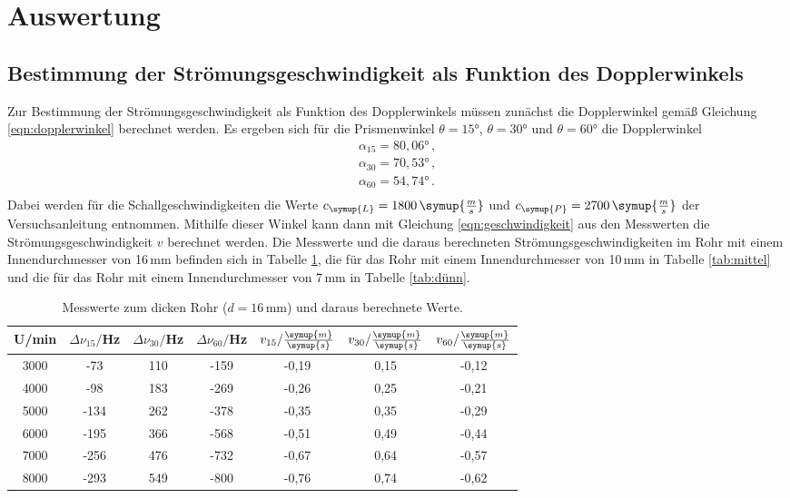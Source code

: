 \section{Auswertung}
\label{sec:Auswertung}

\subsection{Bestimmung der Strömungsgeschwindigkeit als Funktion des Dopplerwinkels}
\label{subsec:geschwindigkeit}

Zur Bestimmung der Strömungsgeschwindigkeit als Funktion des Dopplerwinkels müssen
zunächst die Dopplerwinkel gemäß Gleichung \eqref{eqn:dopplerwinkel} berechnet werden.
Es ergeben sich für die Prismenwinkel $\theta=15°$, $\theta=30°$ und $\theta=60°$
die Dopplerwinkel
\begin{align*}
  \alpha_{15}=80{,}06° \,,\\
  \alpha_{30}=70{,}53°\,,\\
  \alpha_{60}=54{,}74° \,.\\
\end{align*}
Dabei werden für die Schallgeschwindigkeiten die Werte $c_{\symup{L}}=1800\,\symup{\frac{m}{s}}$
und $c_{\symup{P}}=2700\,\symup{\frac{m}{s}}$ der Versuchsanleitung \cite{Versuchsanleitung} entnommen.
Mithilfe dieser Winkel kann dann mit Gleichung \eqref{eqn:geschwindigkeit} aus den
Messwerten die Strömungsgeschwindigkeit $v$ berechnet werden. Die Messwerte und die
daraus berechneten Strömungsgeschwindigkeiten im Rohr mit einem Innendurchmesser von
16\,mm befinden sich in Tabelle \ref{tab:dick}, die für das Rohr mit einem
Innendurchmesser von 10\,mm in Tabelle \ref{tab:mittel} und die für das Rohr
mit einem Innendurchmesser von 7\,mm in Tabelle \ref{tab:dünn}.

\begin{table}[htp]
	\begin{center}
    \caption{Messwerte zum dicken Rohr ($d=16\,$mm) und daraus berechnete Werte.}
    \label{tab:dick}
		\begin{tabular}{ccccccc}
		\toprule
			{U/min} & {$\Delta \nu_{15}/$Hz} & {$\Delta \nu_{30}/$Hz} & {$\Delta \nu_{60}/$Hz} &
      {$v_{15}/\frac{\symup{m}}{\symup{s}}$} & {$v_{30}/\frac{\symup{m}}{\symup{s}}$} &
      {$v_{60}/\frac{\symup{m}}{\symup{s}}$}\\
			\midrule
			3000 & -73 & 110 & -159 & -0,19 & 0,15 & -0,12\\
			4000 & -98 & 183 & -269 & -0,26 & 0,25 & -0,21\\
			5000 & -134 & 262 & -378 & -0,35 & 0,35 & -0,29\\
			6000 & -195 & 366 & -568 & -0,51 & 0,49 & -0,44\\
			7000 & -256 & 476 & -732 & -0,67 & 0,64 & -0,57\\
			8000 & -293 & 549 & -800 & -0,76 & 0,74 & -0,62\\
		\bottomrule
		\end{tabular}
	\end{center}
\end{table}

